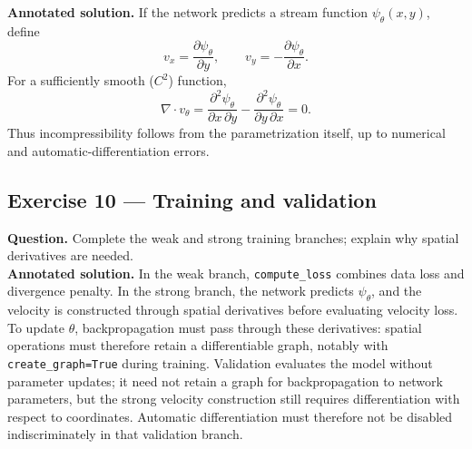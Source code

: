 \documentclass[11pt,a4paper]{article}
\begin{document}
\noindent \textbf{Annotated solution.} If the network predicts a stream
function $\psi_\theta(x,y)$, define
\[
v_x=\frac{\partial\psi_\theta}{\partial y},
\qquad
v_y=-\frac{\partial\psi_\theta}{\partial x}.
\]
For a sufficiently smooth ($C^2$) function,
\[
\nabla\cdot v_\theta
=\frac{\partial^2\psi_\theta}{\partial x\,\partial y}
-\frac{\partial^2\psi_\theta}{\partial y\,\partial x}=0.
\]
Thus incompressibility follows from the parametrization
itself, up to numerical and automatic-differentiation errors.

\subsection{Exercise 10 --- Training and validation}

\noindent \textbf{Question.} Complete the weak and strong training
branches; explain why spatial derivatives are needed.
\\

\noindent \textbf{Annotated solution.} In the weak branch,
\texttt{compute\_loss} combines data loss and divergence
penalty. In the strong branch, the network predicts
$\psi_\theta$, and the velocity is constructed through
spatial derivatives before evaluating velocity loss.
To update $\theta$, backpropagation must pass through
these derivatives: spatial operations must therefore
retain a differentiable graph, notably with
\texttt{create\_graph=True} during training.
Validation evaluates the model without parameter updates;
it need not retain a graph for backpropagation to network
parameters, but the strong velocity construction still
requires differentiation with respect to coordinates.
Automatic differentiation must therefore not be disabled
indiscriminately in that validation branch.
\end{document}
